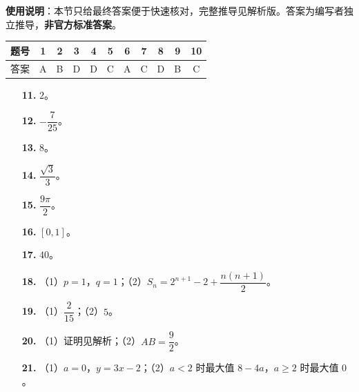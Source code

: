 
\begin{gknotice}
\textbf{使用说明}：本节只给最终答案便于快速核对，完整推导见解析版。答案为编写者独立推导，\textbf{非官方标准答案}。
\end{gknotice}

\begin{center}\begin{tabular}{ccccccccccc}
\toprule
题号 & 1 & 2 & 3 & 4 & 5 & 6 & 7 & 8 & 9 & 10 \\
\midrule
答案 & A & B & D & D & C & A & C & D & B & C \\
\bottomrule
\end{tabular}\end{center}

\begin{itemize}[leftmargin=2.6em]
  \item[\textbf{11.}] $2$。
  \item[\textbf{12.}] $-\dfrac7{25}$。
  \item[\textbf{13.}] $8$。
  \item[\textbf{14.}] $\dfrac{\sqrt3}3$。
  \item[\textbf{15.}] $\dfrac{9\pi}2$。
  \item[\textbf{16.}] $[0,1]$。
  \item[\textbf{17.}] $40$。
\end{itemize}

\begin{itemize}[leftmargin=2.6em]
  \item[\textbf{18.}] （1）$p=1$，$q=1$；（2）$S_n=2^{n+1}-2+\dfrac{n(n+1)}2$。
  \item[\textbf{19.}] （1）$\dfrac2{15}$；（2）$5$。
  \item[\textbf{20.}] （1）证明见解析；（2）$AB=\dfrac92$。
  \item[\textbf{21.}] （1）$a=0$，$y=3x-2$；（2）$a<2$ 时最大值 $8-4a$，$a\geqslant2$ 时最大值 $0$。
\end{itemize}
